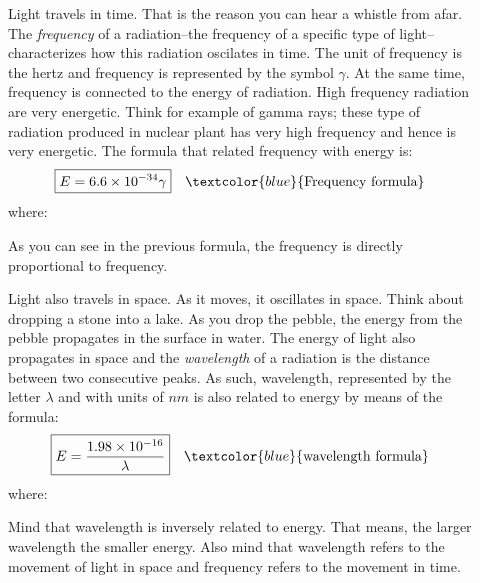 \documentclass[main.tex]{subfiles}
\begin{document}
\begin{description}
\item[] Light travels in time. That is the reason you can hear a whistle from afar. The \emph{frequency} of a radiation--the frequency of a specific type of light--characterizes how this radiation oscilates in time. The unit of frequency is the hertz and frequency is represented by the symbol $\gamma$. At the same time, frequency is connected to the energy of radiation. High frequency radiation are very energetic. Think for example of gamma rays; these type of radiation produced in nuclear plant has very high frequency and hence is very energetic. The formula that related frequency with energy is:
\begin{equation*}
\boxed{  E=6.6\times 10^{-34}\gamma  } \quad \textcolor{blue}{\text{Frequency formula}}
\end{equation*}
where:
As you can see in the previous formula, the frequency is directly proportional to frequency.
\item[] Light also travels in space. As it moves, it oscillates in space. Think about dropping a stone into a lake. As you drop the pebble, the energy from the pebble propagates in the surface in water. The energy of light also propagates in space and the \emph{wavelength} of a radiation is the distance between two consecutive peaks. As such, wavelength, represented by the letter $\lambda$ and with units of $nm$ is also related to energy by means of the formula:
\begin{equation*}
\boxed{  E=\frac{1.98\times 10^{-16}}{\lambda}  } \quad \textcolor{blue}{\text{wavelength formula}}
\end{equation*}
where:
Mind that wavelength is inversely related to energy. That means, the larger wavelength the smaller energy. Also mind that wavelength refers to the movement of light in space and frequency refers to the movement in time.


\end{description}
\end{document}
